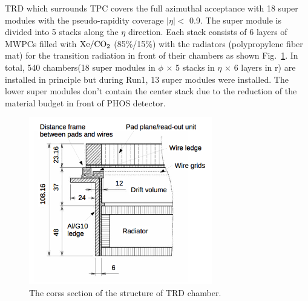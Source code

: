 TRD which surrounds TPC covers the full azimuthal acceptance with 18 super modules with the pseudo-rapidity coverage $|\eta| <$ 0.9. 
The super module is divided into 5 stacks along the $\eta$ direction. 
Each stack consists of 6 layers of MWPCs filled with $\rm{Xe/CO_{2}}$ (85\%/15\%) with the radiators (polypropylene fiber mat) for the transition radiation in front of their chambers as shown Fig.~\ref{fig_3_trdlayout}.
In total, 540 chambers(18 super modules in $\phi$ $\times$ 5 stacks in $\eta$ $\times$ 6 layers in r) are installed in principle but during Run1, 13 super modules were installed. 
The lower super modules don't contain the center stack due to the reduction of the material budget in front of PHOS detector. 
\begin{figure}[!h]
  \centering
  \includegraphics[width=8cm]{chap3/figure/TRD/CrossSection_Chamber.png}
  \caption{The corss section of the structure of TRD chamber\cite{bib_trdtdr}.}
  \label{fig_3_trdlayout}
\end{figure}


